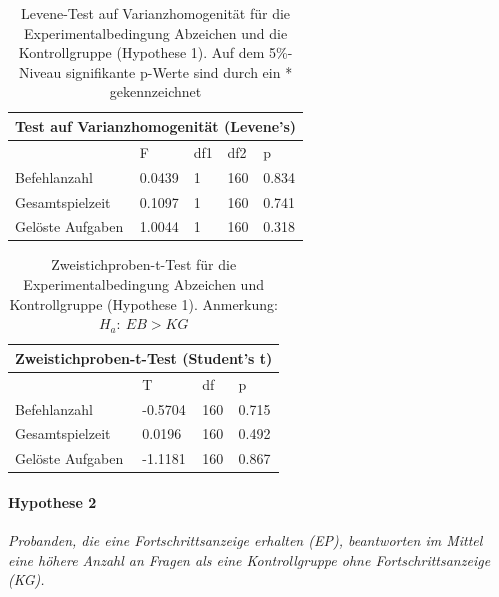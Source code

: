\begin{table}[htbp]
\centering
\begin{tabular}{ |p{4cm}||p{2.0cm}|p{2.0cm}|p{2.0cm}|p{2.0cm}| }
 \hline
 \multicolumn{5}{|c|}{Test auf Varianzhomogenität (Levene's)} \\
 \hline
 & F & df1 &df2 &p \\
 \hline
  Befehlanzahl      & 0.0439    & 1 &   160 & 0.834\\
  Gesamtspielzeit   & 0.1097    & 1 &   160 & 0.741\\
  Gelöste Aufgaben  & 1.0044    & 1 &   160 & 0.318\\
 \hline
\end{tabular}
\caption{Levene-Test auf Varianzhomogenität für die Experimentalbedingung Abzeichen und die Kontrollgruppe (Hypothese 1). Auf dem 5\%-Niveau signifikante p-Werte sind durch ein * gekennzeichnet}
\label{levene_hypo_1}
\end{table}
\begin{table}[htbp]
\centering
\begin{tabular}{ |p{4cm}||p{2.0cm}|p{2.0cm}|p{2.0cm}| }
 \hline
 \multicolumn{4}{|c|}{Zweistichproben-t-Test (Student's t)} \\
 \hline
 & T &df & p \\
 \hline
  Befehlanzahl       & -0.5704  &   160 & 0.715\\
  Gesamtspielzeit    &  0.0196  &   160 & 0.492\\
  Gelöste Aufgaben   & -1.1181  &   160 & 0.867\\
 \hline
\end{tabular}
\caption{Zweistichproben-t-Test für die Experimentalbedingung Abzeichen und Kontrollgruppe (Hypothese 1). Anmerkung: $H_a:\: EB > KG$}
\label{ttest_hypo_1}
\end{table}



\paragraph{Hypothese 2 }
\begin{center}
    \textit{Probanden, die eine Fortschrittsanzeige erhalten (EP), beantworten im Mittel eine höhere Anzahl an Fragen als eine Kontrollgruppe ohne Fortschrittsanzeige (KG).} 
\end{center}

